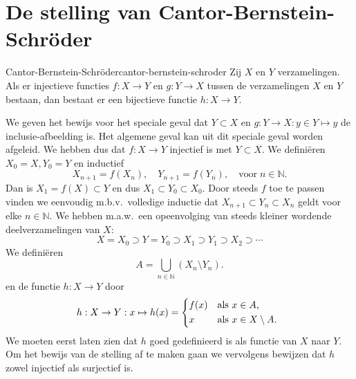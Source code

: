 \section{De stelling van Cantor-Bernstein-Schröder}
\begin{stelling}{Cantor-Bernstein-Schröder}{cantor-bernstein-schroder}
    Zij $X$ en $Y$ verzamelingen.
    Als er injectieve functies $f: X \to Y$ en $g: Y \to X$ tussen de verzamelingen $X$ en $Y$ bestaan, dan bestaat er een bijectieve functie $h: X \to Y$.
\end{stelling}
\begin{bewijs}{}{}
    We geven het bewijs voor het speciale geval dat $Y \subset X$ en $g: Y \to X: y \in Y \mapsto y$ de inclusie-afbeelding is.
    Het algemene geval kan uit dit speciale geval
    worden afgeleid.
    We hebben dus dat $f: X \to Y$ injectief is met $Y \subset X$.
    We definiëren $X_0 = X, Y_0 = Y$ en inductief
    \begin{equation}
        X_{n+1} = f(X_n), \quad Y_{n+1} = f(Y_n), \quad \text{voor}\; n \in \mathbb{N}. \label{eq:cbs-0}
    \end{equation}
    Dan is $X_1 = f(X) \subset Y$ en dus $X_1 \subset Y_0 \subset X_0$.
    Door steeds $f$ toe te passen vinden we eenvoudig m.b.v.\ volledige inductie dat $X_{n+1} \subset Y_n \subset X_n$ geldt voor elke $n \in \mathbb{N}$.
    We hebben m.a.w.\ een opeenvolging van steeds kleiner wordende deelverzamelingen van $X$:
    \begin{equation}
        X = X_0 \supset Y = Y_0 \supset X_1 \supset Y_1 \supset X_2 \supset \cdots
        \label{eq:cbs-I}
    \end{equation}
    We definiëren
    \begin{equation}
        A = \bigcup_{n\in \mathbb{N}} (X_n \setminus Y_n). \label{eq:cbs-II}
    \end{equation}
    en de functie $h: X \to Y$ door
    \begin{equation}
        h: X \to Y: x \mapsto h(x) =
        \begin{cases*}
            f(x) & als $x\in A$, \\
            x & als $x\in X\setminus A$.
        \end{cases*}
        \label{eq:cbs-III}
    \end{equation}
    We moeten eerst laten zien dat $h$ goed gedefinieerd is als functie van $X$ naar $Y$.
    Om het bewijs van de stelling af te maken gaan we vervolgens bewijzen dat $h$ zowel injectief als surjectief is.


\end{bewijs}
